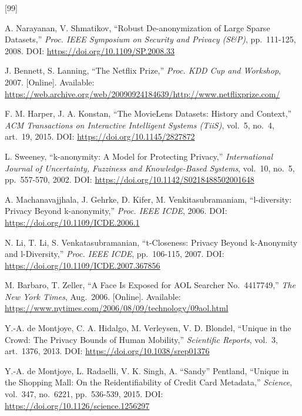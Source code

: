 \documentclass[a4paper,12pt,oneside]{book}
\renewcommand{\_}{\textunderscore\allowbreak}
\begin{document}
\begin{thebibliography}{[99]}
\fontsize{13}{16}\selectfont

 A. Narayanan, V. Shmatikov, ``Robust De-anonymization of Large Sparse Datasets,'' \textit{Proc. IEEE Symposium on Security and Privacy (S\&P)}, pp.~111-125, 2008. DOI: \url{https://doi.org/10.1109/SP.2008.33}

 J. Bennett, S. Lanning, ``The Netflix Prize,'' \textit{Proc. KDD Cup and Workshop}, 2007. [Online]. Available: \url{https://web.archive.org/web/20090924184639/http://www.netflixprize.com/}

 F. M. Harper, J. A. Konstan, ``The MovieLens Datasets: History and Context,'' \textit{ACM Transactions on Interactive Intelligent Systems (TiiS)}, vol.~5, no.~4, art.~19, 2015. DOI: \url{https://doi.org/10.1145/2827872}

 L. Sweeney, ``k-anonymity: A Model for Protecting Privacy,'' \textit{International Journal of Uncertainty, Fuzziness and Knowledge-Based Systems}, vol.~10, no.~5, pp.~557-570, 2002. DOI: \url{https://doi.org/10.1142/S0218488502001648}

 A. Machanavajjhala, J. Gehrke, D. Kifer, M. Venkitasubramaniam, ``l-diversity: Privacy Beyond k-anonymity,'' \textit{Proc. IEEE ICDE}, 2006. DOI: \url{https://doi.org/10.1109/ICDE.2006.1}

 N. Li, T. Li, S. Venkatasubramanian, ``t-Closeness: Privacy Beyond k-Anonymity and l-Diversity,'' \textit{Proc. IEEE ICDE}, pp.~106-115, 2007. DOI: \url{https://doi.org/10.1109/ICDE.2007.367856}

 M. Barbaro, T. Zeller, ``A Face Is Exposed for AOL Searcher No.~4417749,'' \textit{The New York Times}, Aug.~2006. [Online]. Available: \url{https://www.nytimes.com/2006/08/09/technology/09aol.html}

 Y.-A. de Montjoye, C. A. Hidalgo, M. Verleysen, V. D. Blondel, ``Unique in the Crowd: The Privacy Bounds of Human Mobility,'' \textit{Scientific Reports}, vol.~3, art.~1376, 2013. DOI: \url{https://doi.org/10.1038/srep01376}

 Y.-A. de Montjoye, L. Radaelli, V. K. Singh, A. ``Sandy'' Pentland, ``Unique in the Shopping Mall: On the Reidentifiability of Credit Card Metadata,'' \textit{Science}, vol.~347, no.~6221, pp.~536-539, 2015. DOI: \url{https://doi.org/10.1126/science.1256297}


\end{thebibliography}
\end{document}
